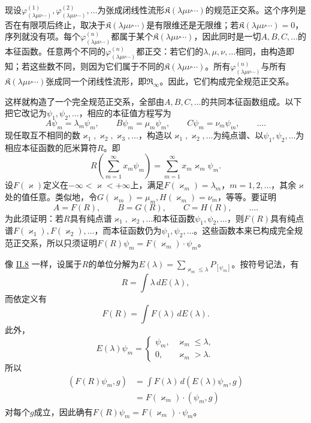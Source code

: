 \documentclass[fontsize=13pt,twoside,openany,headings=normal,parskip=false,bookmarkpackage=false,DIV=calc]{scrbook}
\begin{document}
现设$\varphi^{(1)}_{(\lambda\mu\nu\cdots)},\allowbreak \varphi^{(2)}_{(\lambda\mu\nu\cdots)},\allowbreak \ldots$为张成闭线性流形$\mathfrak K(\lambda\mu\nu\cdots)$的规范正交系。这个序列是否在有限项后终止，取决于$\mathfrak K(\lambda\mu\nu\cdots)$是有限维还是无限维；若$\mathfrak K(\lambda\mu\nu\cdots)=0$，序列就没有项。每个$\varphi^{(n)}_{(\lambda\mu\nu\cdots)}$都属于某个$\mathfrak K(\lambda\mu\nu\cdots)$，因此同时是一切$A,\allowbreak B,\allowbreak C,\allowbreak \ldots$的本征函数。任意两个不同的$\varphi^{(n)}_{(\lambda\mu\nu\cdots)}$都正交：若它们的$\lambda,\allowbreak \mu,\allowbreak \nu,\allowbreak \ldots$相同，由构造即知；若这些数不同，则因为它们属于不同的$\mathfrak K(\lambda\mu\nu\cdots)$。所有$\varphi^{(n)}_{(\lambda\mu\nu\cdots)}$与所有$\mathfrak K(\lambda\mu\nu\cdots)$张成同一个闭线性流形，即$\mathfrak R_\infty$。因此，它们构成完全规范正交系。

\hypertarget{origpage-92}{}\label{origpage-92}这样就构造了一个完全规范正交系，全部由$A,\allowbreak B,\allowbreak C,\allowbreak \ldots$的共同本征函数组成。以下把它改记为$\psi_1,\allowbreak \psi_2,\allowbreak \ldots$，相应的本征值方程写为
\[
A\psi_m=\lambda_m\psi_m,\qquad
B\psi_m=\mu_m\psi_m,\qquad
C\psi_m=\nu_m\psi_m,\qquad\ldots.
\]
现任取互不相同的数$\varkappa_1,\allowbreak \varkappa_2,\allowbreak \varkappa_3,\allowbreak \ldots$，构造以$\varkappa_1,\allowbreak \varkappa_2,\allowbreak \ldots$为纯点谱、以$\psi_1,\allowbreak \psi_2,\allowbreak \ldots$为相应本征函数的厄米算符$R$。即
\[
R\left(\sum_{m=1}^\infty x_m\psi_m\right)
=\sum_{m=1}^\infty x_m\varkappa_m\psi_m.
\]
设$F(\varkappa)$定义在$-\infty<\varkappa<+\infty$上，满足$F(\varkappa_m)=\lambda_m$，$m=1,\allowbreak 2,\allowbreak \ldots$，其余$\varkappa$处的值任意。类似地，令$G(\varkappa_m)=\mu_m,\allowbreak H(\varkappa_m)=\nu_m$，等等。要证明
\[
A=F(R),\qquad B=G(R),\qquad C=H(R),\qquad\ldots.
\]
为此须证明：若$R$具有纯点谱$\varkappa_1,\allowbreak \varkappa_2,\allowbreak \ldots$和本征函数$\psi_1,\allowbreak \psi_2,\allowbreak \ldots$，则$F(R)$具有纯点谱$F(\varkappa_1),\allowbreak F(\varkappa_2),\allowbreak \ldots$，而本征函数仍为$\psi_1,\allowbreak \psi_2,\allowbreak \ldots$。这些函数本来已构成完全规范正交系，所以只须证明$F(R)\psi_m=F(\varkappa_m)\cdot\psi_m$。

像 \hyperref[sec:II.8]{II.8} 一样，设属于$R$的单位分解为$E(\lambda)=\sum_{\varkappa_m\leq\lambda}P_{[\psi_m]}$。按符号记法，有
\[
R=\int\lambda\,dE(\lambda),
\]
而依定义有
\[
F(R)=\int F(\lambda)\,dE(\lambda).
\]
此外，
\[
E(\lambda)\psi_m=\begin{cases}\psi_m,&\varkappa_m\leq\lambda,\\0,&\varkappa_m>\lambda.\end{cases}
\]
所以
\begin{align*}
(F(R)\psi_m,g)&=\int F(\lambda)\,d(E(\lambda)\psi_m,g)\\
&=F(\varkappa_m)\cdot(\psi_m,g)
\end{align*}
对每个$g$成立，因此确有$F(R)\psi_m=F(\varkappa_m)\cdot\psi_m$。
\end{document}
